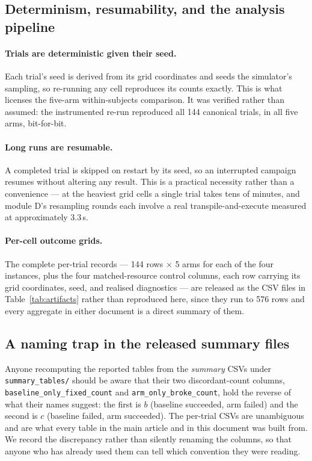 \documentclass[preprint,11pt]{elsarticle}
\begin{document}
\subsection{Determinism, resumability, and the analysis pipeline}

\paragraph{Trials are deterministic given their seed.} Each trial's seed
is derived from its grid coordinates and seeds the simulator's sampling,
so re-running any cell reproduces its counts exactly. This is what
licenses the five-arm within-subjects comparison. It was verified rather
than assumed: the instrumented re-run reproduced all 144 canonical
trials, in all five arms, bit-for-bit.

\paragraph{Long runs are resumable.} A completed trial is skipped on
restart by its seed, so an interrupted campaign resumes without altering
any result. This is a practical necessity rather than a convenience --- at
the heaviest grid cells a single trial takes tens of minutes, and module
D's resampling rounds each involve a real transpile-and-execute measured
at approximately $3.3$\,s.

\paragraph{Per-cell outcome grids.} The complete per-trial records --- 144
rows $\times$ 5 arms for each of the four instances, plus the four
matched-resource control columns, each row carrying its grid coordinates,
seed, and realised diagnostics --- are released as the CSV files in
Table~\ref{tab:artifacts} rather than reproduced here, since they run to
576 rows and every aggregate in either document is a direct summary of
them.

\subsection{A naming trap in the released summary files}

Anyone recomputing the reported tables from the \emph{summary} CSVs under
\texttt{summary\_tables/} should be aware that their two discordant-count
columns, \texttt{baseline\_only\_fixed\_count} and
\texttt{arm\_only\_broke\_count}, hold the reverse of what their names
suggest: the first is $b$ (baseline succeeded, arm failed) and the second
is $c$ (baseline failed, arm succeeded). The per-trial CSVs are
unambiguous and are what every table in the main article and in this
document was built from. We record the discrepancy rather than silently
renaming the columns, so that anyone who has already used them can tell
which convention they were reading.



\end{document}

